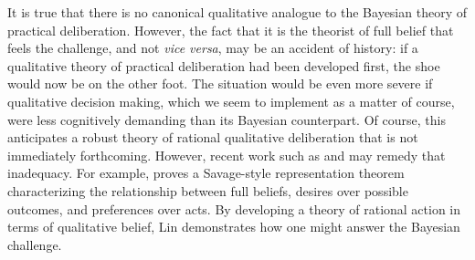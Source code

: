 It is true that there is no canonical qualitative analogue to the Bayesian
theory of practical deliberation. However, the fact that it is the theorist of
full belief that feels the challenge, and not {\em vice versa}, may be an
accident of history: if a qualitative theory of practical deliberation had been
developed first, the shoe would now be on the other foot. The situation would be
even more severe if qualitative decision making, which we seem to implement as a
matter of course, were less cognitively demanding than its Bayesian counterpart.
Of course, this anticipates a robust  theory of rational qualitative
deliberation that is not immediately forthcoming. However, recent work such as
\citet{lin2013foundations} and \citet{spohn2017knightian, spohn2019defeasible}
may remedy that inadequacy. For example, \citet{lin2013foundations} proves a
Savage-style representation theorem characterizing the relationship between full
beliefs, desires over possible outcomes, and preferences over acts. By
developing a theory of rational action in terms of qualitative belief, Lin
demonstrates how one might answer the Bayesian challenge. 


